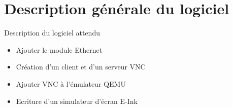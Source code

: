 \section[Description]{Description générale du logiciel}

\begin{frame}

	\begin{block}{Description du logiciel attendu}

		\begin{itemize}	
			\item Ajouter le module Ethernet
			\item Création d'un client et d'un serveur VNC
			\item Ajouter VNC à l'émulateur QEMU
			\item Ecriture d'un simulateur d'écran E-Ink
		\end{itemize}

	\end{block}

\end{frame}

